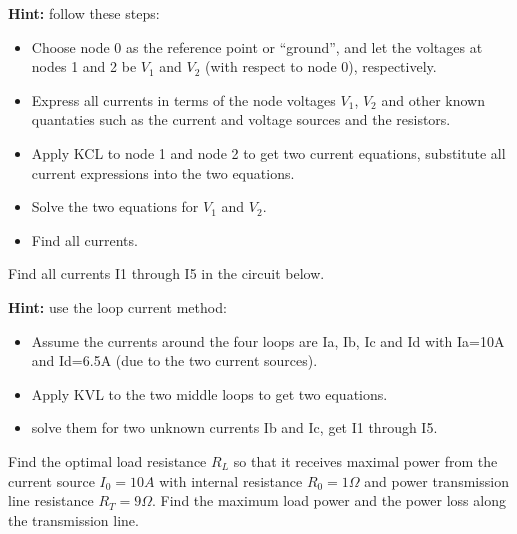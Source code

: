 {\bf Hint:} follow these steps:
\begin{itemize}
\item Choose node 0 as the reference point or ``ground'', and let the 
	voltages at nodes 1 and 2 be $V_1$ and $V_2$ (with respect to
	node 0), respectively. 
\item Express all currents in terms of the node voltages $V_1$, $V_2$
	and other known quantaties such as the current and voltage sources
	and the resistors.
\item Apply KCL to node 1 and node 2 to get two current equations, 
	substitute all current expressions into the two equations.
\item Solve the two equations for $V_1$ and $V_2$.
\item Find all currents.
\end{itemize}



\item Find all currents I1 through I5 in the circuit below. 

{\bf Hint:} use the loop current method: 

\begin{itemize}
\item Assume the currents around the four loops are Ia, Ib, Ic and Id 
  with Ia=10A and Id=6.5A (due to the two current sources).
\item Apply KVL to the two middle loops to get two equations.
\item solve them for two unknown currents Ib and Ic, get I1 through I5.
\end{itemize}




\item Find the optimal load resistance $R_L$ so that it receives maximal
power from the current source $I_0=10A$ with internal resistance 
$R_0=1\Omega$ and power transmission line resistance $R_T=9\Omega$. 
Find the maximum load power and the power loss along the transmission 
line.

